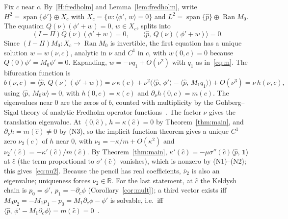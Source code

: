 \documentclass[11pt]{article}
\theoremstyle{plain}
\theoremstyle{definition}
\theoremstyle{remark}
\newcommand{\ip}[2]{\langle #1,\,#2\rangle}
\newcommand{\ph}{\hat p}
\newcommand{\R}{\mathbb{R}}
\newcommand{\one}{\mathbf 1}
\begin{document}
Fix $c$ near $\hat c$. By~\ref{H:fredholm} and Lemma~\ref{lem:fredholm}, write
$H^2=\operatorname{span}\{\phi'\}\oplus X_c$ with $X_c=\{w:\ip{\phi'}{w}=0\}$ and
$L^2=\operatorname{span}\{\ph\}\oplus\operatorname{Ran}M_0$. The equation $Q(\nu)(\phi'+w)=0$,
$w\in X_c$, splits into
\[
  (I-\Pi)Q(\nu)(\phi'+w)=0,\qquad \ip{\ph}{Q(\nu)(\phi'+w)}=0 .
\]
Since $(I-\Pi)M_0:X_c\to\operatorname{Ran}M_0$ is invertible, the first equation has a unique
solution $w=w(\nu,c)$, analytic in $\nu$ and $C^1$ in $c$, with $w(0,c)=0$ because
$Q(0)\phi'=M_0\phi'=0$. Expanding, $w=-\nu q_1+O(\nu^2)$ with $q_1$ as in~\eqref{eq:m}. The
bifurcation function is
\[
  b(\nu,c)=\ip{\ph}{Q(\nu)(\phi'+w)}
  =\nu\,\kappa(c)+\nu^2\bigl(\ip{\ph}{\phi'}-\ip{\ph}{M_1q_1}\bigr)+O(\nu^3)
  =\nu\,h(\nu,c),
\]
using $\ip{\ph}{M_0w}=0$, with $h(0,c)=\kappa(c)$ and $\partial_\nu h(0,c)=m(c)$. The
eigenvalues near $0$ are the zeros of $b$, counted with multiplicity by the Gohberg--Sigal
theory of analytic Fredholm operator functions~\cite{GS71}. The factor $\nu$ gives the
translation eigenvalue. At $(0,\hat c)$, $h=\kappa(\hat c)=0$ by Theorem~\ref{thm:main}, and
$\partial_\nu h=m(\hat c)\neq0$ by (N3), so the implicit function theorem gives a unique
$C^1$ zero $\nu_2(c)$ of $h$ near $0$, with $\nu_2=-\kappa/m+O(\kappa^2)$ and
$\nu_2'(\hat c)=-\kappa'(\hat c)/m(\hat c)$. By Theorem~\ref{thm:main},
$\kappa'(\hat c)=-\mu\sigma''(\hat c)\ip{\ph}{\one}$ at $\hat c$ (the term proportional to
$\sigma'(\hat c)$ vanishes), which is nonzero by (N1)--(N2); this gives~\eqref{eq:nu2}.
Because the pencil has real coefficients, $\bar\nu_2$ is also an eigenvalue; uniqueness
forces $\nu_2\in\R$. For the last statement, at $\hat c$ the Keldysh chain is
$p_0=\phi'$, $p_1=-\partial_c\phi$ (Corollary~\ref{cor:mult}); a third vector exists iff
$M_0p_2=-M_1p_1-p_0=M_1\partial_c\phi-\phi'$ is solvable, i.e.\ iff
$\ip{\ph}{\phi'-M_1\partial_c\phi}=m(\hat c)=0$~\cite{Mar88}.
\end{document}
